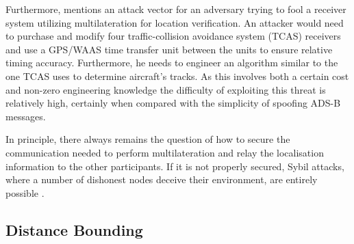 \documentclass[english]{IEEEtran}
\begin{document}
Furthermore, \cite{schuchman2011automatic} mentions an attack vector
for an adversary trying to fool a receiver system utilizing multilateration
for location verification. An attacker would need to purchase and
modify four traffic-collision avoidance system (TCAS) receivers\emph{
}and use a GPS/WAAS time transfer unit between the units\emph{ }to
ensure relative timing accuracy. Furthermore, he needs to engineer
an algorithm similar to the one TCAS uses to determine aircraft's
tracks. As this involves both a certain cost and non-zero engineering
knowledge the difficulty of exploiting this threat is relatively high,
certainly when compared with the simplicity of spoofing ADS-B messages. 

In principle, there always remains the question of how to secure the
communication needed to perform multilateration and relay the localisation
information to the other participants. If it is not properly secured,
Sybil attacks, where a number of dishonest nodes deceive their environment,
are entirely possible \cite{douceur2002sybil}. \\



\subsection{Distance Bounding\label{sub:Distance-Bounding}}
\end{document}
